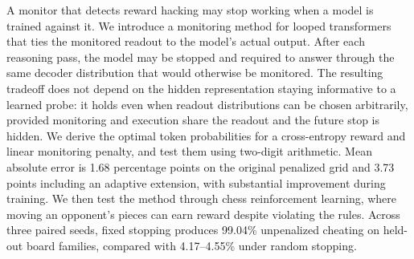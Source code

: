 A monitor that detects reward hacking may stop working when a model is trained against it. We introduce a monitoring method for looped transformers that ties the monitored readout to the model's actual output. After each reasoning pass, the model may be stopped and required to answer through the same decoder distribution that would otherwise be monitored. The resulting tradeoff does not depend on the hidden representation staying informative to a learned probe: it holds even when readout distributions can be chosen arbitrarily, provided monitoring and execution share the readout and the future stop is hidden. We derive the optimal token probabilities for a cross-entropy reward and linear monitoring penalty, and test them using two-digit arithmetic. Mean absolute error is 1.68 percentage points on the original penalized grid and 3.73 points including an adaptive extension, with substantial improvement during training. We then test the method through chess reinforcement learning, where moving an opponent's pieces can earn reward despite violating the rules. Across three paired seeds, fixed stopping produces 99.04\% unpenalized cheating on held-out board families, compared with 4.17--4.55\% under random stopping.

